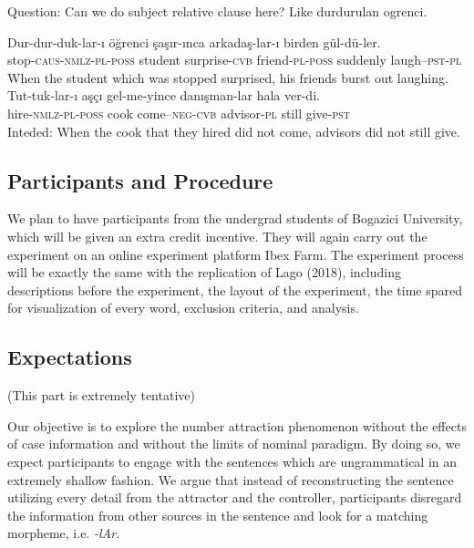 \documentclass[doc]{apa6}
\begin{document}
Question: Can we do subject relative clause here? Like durdurulan
ogrenci.

\begin{exe}
\ex
\begin{xlist}
\ex \label{fillerreg1}
\gll Dur-dur-duk-lar-{\i} \"{o}\u{g}renci \c{s}a\c{s}{\i}r-{\i}nca arkada\c{s}-lar-{\i} birden g\"{u}l-d\"{u}-ler.\\
stop-\textsc{caus}-\textsc{nmlz}-\textsc{pl}-\textsc{poss} student surprise-\textsc{cvb} friend-\textsc{pl}-\textsc{poss} suddenly laugh--\textsc{pst}-\textsc{pl}\\
\glt When the student which was stopped surprised, his friends burst out laughing.
\ex \label{fillerreg2}
\gll *Tut-tuk-lar-{\i} a\c{s}\c{c}{\i} gel-me-yince dan{\i}\c{s}man-lar hala ver-di.\\
hire-\textsc{nmlz}-\textsc{pl}-\textsc{poss} cook come--\textsc{neg}-\textsc{cvb} advisor-\textsc{pl} still give-\textsc{pst}\\
\glt Inteded: When the cook that they hired did not come, advisors did not still give. 
\end{xlist}
\end{exe}

\subsection{Participants and
Procedure}\label{participants-and-procedure-1}

We plan to have participants from the undergrad students of Bogazici
University, which will be given an extra credit incentive. They will
again carry out the experiment on an online experiment platform Ibex
Farm. The experiment process will be exactly the same with the
replication of Lago (2018), including descriptions before the
experiment, the layout of the experiment, the time spared for
visualization of every word, exclusion criteria, and analysis.

\subsection{Expectations}\label{expectations}

(This part is extremely tentative)

Our objective is to explore the number attraction phenomenon without the
effects of case information and without the limits of nominal paradigm.
By doing so, we expect participants to engage with the sentences which
are ungrammatical in an extremely shallow fashion. We argue that instead
of reconstructing the sentence utilizing every detail from the attractor
and the controller, participants disregard the information from other
sources in the sentence and look for a matching morpheme, i.e.
\emph{-lAr}.
\end{document}
